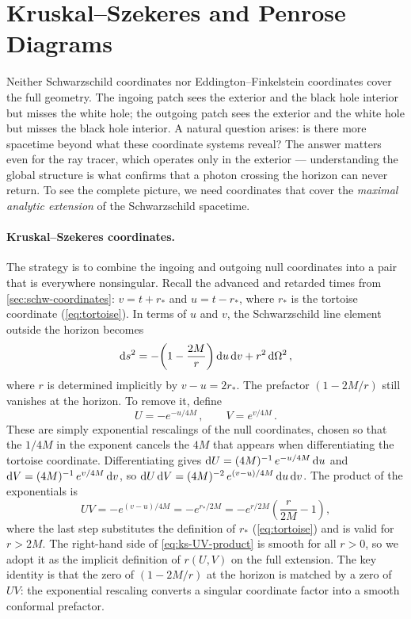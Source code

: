 \section{Kruskal--Szekeres and Penrose Diagrams}
\label{sec:schw-kruskal}

Neither Schwarzschild coordinates nor Eddington--Finkelstein coordinates
cover the full geometry.  The ingoing patch sees the exterior and the
black hole interior but misses the white hole; the outgoing patch sees
the exterior and the white hole but misses the black hole interior.
A natural question arises: is there more spacetime beyond what these
coordinate systems reveal?  The answer matters even for the ray tracer,
which operates only in the exterior --- understanding the global
structure is what confirms that a photon crossing the horizon can never
return.  To see the complete picture, we need coordinates that cover the
\emph{maximal analytic extension} of the Schwarzschild spacetime.

\paragraph{Kruskal--Szekeres coordinates.}

The strategy is to combine the ingoing and outgoing null coordinates
into a pair that is everywhere nonsingular.  Recall the advanced and
retarded times from \cref{sec:schw-coordinates}:
$v = t + r_*$ and $u = t - r_*$, where $r_*$ is the tortoise coordinate
(\cref{eq:tortoise}).  In terms of $u$ and $v$, the Schwarzschild line
element outside the horizon becomes
%
\begin{equation}
  \mathrm{d} s^2 = -\!\left(1 - \frac{2M}{r}\right)\mathrm{d} u\,\mathrm{d} v
           + r^2\,\mathrm{d}\Omega^2 \,,
  \label{eq:ks-double-null}
\end{equation}
%
where $r$ is determined implicitly by $v - u = 2r_*$.  The prefactor
$(1 - 2M/r)$ still vanishes at the horizon.  To remove it, define
%
\begin{equation}
  U = -e^{-u/4M} \,, \qquad V = e^{v/4M} \,.
  \label{eq:ks-UV-def}
\end{equation}
%
These are simply exponential rescalings of the null coordinates,
chosen so that the $1/4M$ in the exponent cancels the $4M$ that
appears when differentiating the tortoise coordinate.  Differentiating
gives $\mathrm{d} U = (4M)^{-1}\,e^{-u/4M}\,\mathrm{d} u$ and
$\mathrm{d} V = (4M)^{-1}\,e^{v/4M}\,\mathrm{d} v$, so
$\mathrm{d} U\,\mathrm{d} V = (4M)^{-2}\,e^{(v-u)/4M}\,\mathrm{d} u\,\mathrm{d} v$.
The product of the exponentials is
%
\begin{equation}
  UV = -e^{(v-u)/4M} = -e^{r_*/2M}
     = -e^{r/2M}\!\left(\frac{r}{2M} - 1\right) ,
  \label{eq:ks-UV-product}
\end{equation}
%
where the last step substitutes the definition of $r_*$
(\cref{eq:tortoise}) and is valid for $r > 2M$.  The right-hand
side of \cref{eq:ks-UV-product} is smooth for all $r > 0$, so we
adopt it as the implicit definition of $r(U,V)$ on the full
extension.  The key identity is that the zero of $(1 - 2M/r)$
at the horizon is matched by a zero of $UV$: the exponential
rescaling converts a singular coordinate factor into a smooth
conformal prefactor.

